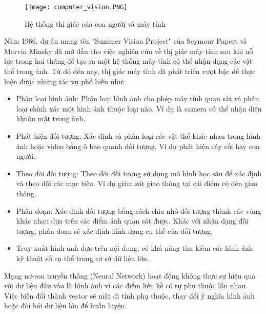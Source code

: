 \documentclass[../the.tex]{subfiles}
\begin{document}
\begin{figure}[H]
	\centering
	\texttt{[image: computer\_vision.PNG]}
	\caption{Hệ thống thị giác của con người và máy tính}
	\label{fig:computer_vision}
\end{figure}

{\fontsize{13}{12} \selectfont

Năm 1966, dự án mang tên "Summer Vision Project" \cite{Papert1966TheSV} của Seymour Papert và Marvin Minsky  đã mở đầu cho việc nghiên cứu về thị giác máy tính sau khi nỗ lực trong hai tháng để tạo ra một hệ thống máy tính có thể
nhận dạng các vật thể trong ảnh. Từ đó đến nay, thị giác máy tính đã phát triển vượt bậc để thực hiện được những tác vụ phổ biến như:

\begin{itemize}
	\item Phân loại hình ảnh: Phân loại hình ảnh cho phép máy tính quan sát và phân loại chính xác một hình ảnh thuộc loại nào.
	      Ví dụ là camera có thể nhận diện khuôn mặt trong ảnh.

	\item Phát hiện đối tượng: Xác định và phân loại các vật thể khác nhau trong hình ảnh hoặc video bằng ô bao quanh đối tượng. Ví dụ phát hiện cây cối hay con người.

	\item Theo dõi đối tượng: Theo dõi đối tượng sử dụng mô hình học sâu để xác định và theo dõi các mục tiêu. Ví dụ giám sát giao thông tại cái điểm có đèn giao thông.

	\item Phân đoạn: Xác định đối tượng bằng cách chia nhỏ đối tượng thành các vùng khác nhau dựa trên các điểm ảnh quan sát được. Khác với nhận dạng đối tượng, phân đoạn sẽ xác định hình dạng cụ thể của đối tượng.

	\item Truy xuất hình ảnh dựa trên nội dung: có khả năng tìm kiếm các hình ảnh kỹ thuật số cụ thể trong cơ sở dữ liệu lớn.
\end{itemize}

}

{\fontsize{13}{12} \selectfont

Mạng nơ-ron truyền thống (Neural Network) hoạt động không thực sự hiệu quả với dữ liệu đầu vào là hình ảnh vì các điểm liền kề có sự phụ thuộc lẫn nhau.
Việc biến đổi thành vector sẽ mất đi tính phụ thuộc, thay đổi ý nghĩa hình ảnh hoặc đòi hỏi dữ liệu lớn để huấn luyện.

}
\end{document}

